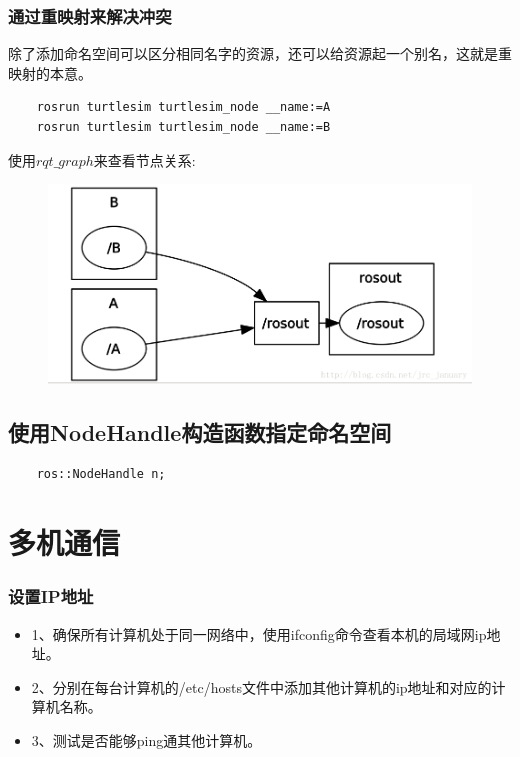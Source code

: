 \documentclass[9pt, oneside]{book}
\begin{document}
\subsubsection{通过重映射来解决冲突}

除了添加命名空间可以区分相同名字的资源，还可以给资源起一个别名，这就是重映射的本意。

\begin{verbatim}
    rosrun turtlesim turtlesim_node __name:=A
    rosrun turtlesim turtlesim_node __name:=B
\end{verbatim}

使用$rqt\_graph$来查看节点关系:

\begin{figure}[H]
    \centering
    \includegraphics[width = 0.5\linewidth]{image/namespace_eg2.png}
\end{figure}

\subsection{使用NodeHandle构造函数指定命名空间}




\begin{verbatim}
    ros::NodeHandle n;
\end{verbatim}

\section{多机通信}

\subsubsection{设置IP地址}

\begin{itemize}
    \item 1、确保所有计算机处于同一网络中，使用ifconfig命令查看本机的局域网ip地址。
    \item 2、分别在每台计算机的/etc/hosts文件中添加其他计算机的ip地址和对应的计算机名称。
    \item 3、测试是否能够ping通其他计算机。
\end{itemize}
\end{document}
